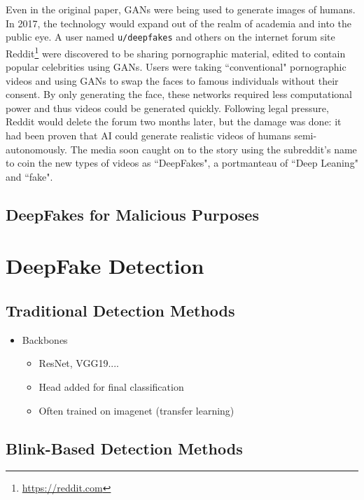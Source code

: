 Even in the original paper, GANs were being used to generate images of humans\cite{goodfellow2014generative}. In 2017, the technology would expand out of the realm of academia and into the public eye. A user named \verb|u/deepfakes| and others on the internet forum site Reddit\footnote{\url{https://reddit.com}} were discovered to be sharing pornographic material, edited to contain popular celebrities using GANs\cite{cole2018reddit}. Users were taking ``conventional" pornographic videos and using GANs to swap the faces to famous individuals without their consent. By only generating the face, these networks required less computational power and thus videos could be generated quickly. Following legal pressure, Reddit would delete the forum two months later\cite{cole2018reddit}, but the damage was done: it had been proven that AI could generate realistic videos of humans semi-autonomously. The media soon caught on to the story using the subreddit's name to coin the new types of videos as ``DeepFakes", a portmanteau of ``Deep Leaning" and ``fake".


\subsection{DeepFakes for Malicious Purposes}

\section{DeepFake Detection}

\subsection{Traditional Detection Methods}

\begin{itemize}
    \item Backbones
    \begin{itemize}
        \item ResNet, VGG19....
        \item Head added for final classification
        \item Often trained on imagenet (transfer learning)
    \end{itemize}
\end{itemize}

\subsection{Blink-Based Detection Methods}

